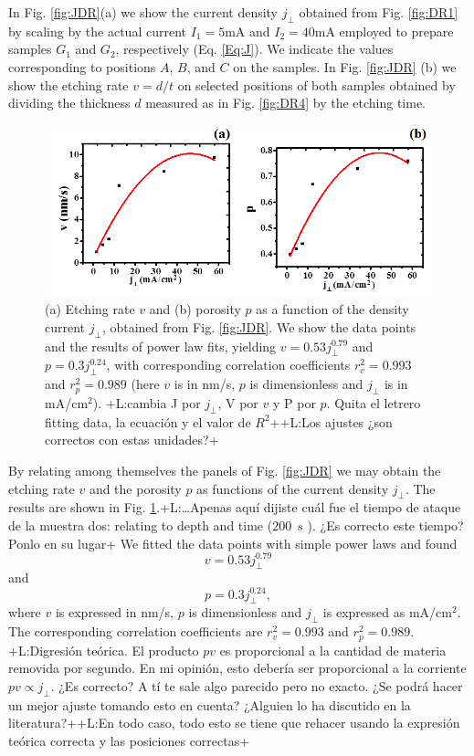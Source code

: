 \documentclass{article}
\newcommand{\notaL}[1]{{\color{blue}+L:#1+}}
\begin{document}
In Fig. \ref{fig:JDR}(a) we show the current density
$j_\perp$ obtained from Fig. \ref{fig:DR1} by scaling by the actual
current $I_1=5\text{mA}$ and $I_2=40\text{mA}$ employed to prepare
samples $G_1$ and $G_2$, respectively (Eq. \eqref{Eq:J}). We indicate the values
corresponding to positions $A$, $B$, and $C$ on the samples.
In Fig. \ref{fig:JDR} (b) we show the etching rate $v = d/t$ on
selected positions of both samples obtained by dividing the thickness
$d$ measured as in Fig. \ref{fig:DR4} by the etching time.
\begin{figure}
  \centering
  \includegraphics[width=\textwidth]{Images/grinJD31}
  \caption{(a) Etching rate $v$ and (b) porosity $p$ as a function of the
    density current $j_\perp$, obtained from Fig. \ref{fig:JDR}. We
    show the data points and the results of power
    law fits, yielding $v=0.53j_\perp^{0.79}$ and
    $p=0.3j_\perp^0.24$, with corresponding correlation coefficients
      $r_v^2=0.993$ and $r_p^2=0.989$ (here $v$ is in nm/s, $p$ is
      dimensionless and $j_\perp$ is in mA/cm$^2$). \notaL{cambia J por $j_\perp$, V por $v$ y P
      por $p$. Quita el letrero fitting data, la ecuación y el valor
      de $R^2$}\notaL{Los ajustes ¿son correctos con estas unidades?}}
  \label{fig:Indr1}
\end{figure}
By relating among themselves the panels of Fig. \ref{fig:JDR} we
may obtain the etching rate $v$ and the porosity $p$ as
functions of the current density $j_\perp$. The results are shown in
Fig. \ref{fig:Indr1}.\notaL{\ldots Apenas aquí dijiste cuál fue el
  tiempo de ataque de la muestra dos: relating to depth and time ($
  200 \ \ s $ ). ¿Es correcto este tiempo? Ponlo en su lugar}
We fitted the data points with simple power laws and found
\begin{equation}
  \label{eq:etch}
  v=0.53j_\perp^{0.79}
\end{equation}
and
\begin{equation}
  \label{eq:poros}
  p=0.3j_\perp^{0.24},
\end{equation}
where $v$ is
expressed in nm/s, $p$ is dimensionless and $j_\perp$ is expressed as
mA/cm$^2$. The corresponding correlation coefficients are $r_v^2=0.993$
and $r_p^2=0.989$. \notaL{Digresión teórica. El producto $pv$ es
  proporcional a la cantidad de materia removida por segundo. En mi
  opinión, esto debería ser proporcional a la corriente $pv\propto
  j_\perp$. ¿Es correcto? A tí te sale algo parecido pero no
  exacto. ¿Se podrá hacer un mejor ajuste tomando esto en cuenta?
  ¿Alguien lo ha discutido en la literatura?}\notaL{En todo caso, todo
  esto se tiene que rehacer usando la expresión teórica correcta y las
  posiciones correctas}
\end{document}
